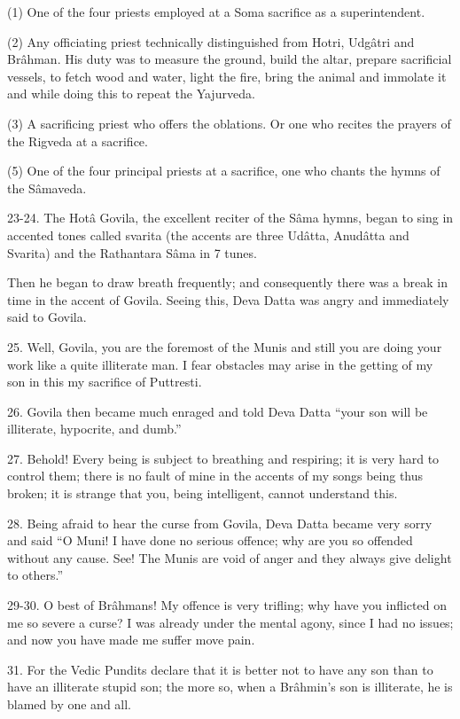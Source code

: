 (1) One of the four priests employed at a Soma sacrifice as a superintendent.

(2) Any officiating priest technically distinguished from Hotri, Udg\^atri and Br\^ahman. His duty was to measure the ground, build the altar, prepare sacrificial vessels, to fetch wood and water, light the fire, bring the animal and immolate it and while doing this to repeat the Yajurveda.

(3) A sacrificing priest who offers the oblations. Or one who recites the prayers of the Rigveda at a sacrifice.

(5) One of the four principal priests at a sacrifice, one who chants the hymns of the S\^amaveda.

23-24. The Hot\^a Govila, the excellent reciter of the S\^ama hymns, began to sing in accented tones called svarita (the accents are three Ud\^atta, Anud\^atta and Svarita) and the Rathantara S\^ama in 7 tunes.

Then he began to draw breath frequently; and consequently there was a break in time in the accent of Govila. Seeing this, Deva Datta was angry and immediately said to Govila.

25. Well, Govila, you are the foremost of the Munis and still you are doing your work like a quite illiterate man. I fear obstacles may arise in the getting of my son in this my sacrifice of Puttresti.

26. Govila then became much enraged and told Deva Datta ``your son will be illiterate, hypocrite, and dumb.''

27. Behold! Every being is subject to breathing and respiring; it is very hard to control them; there is no fault of mine in the accents of my songs being thus broken; it is strange that you, being intelligent, cannot understand this.

28. Being afraid to hear the curse from Govila, Deva Datta became very sorry and said ``O Muni! I have done no serious offence; why are you so offended without any cause. See! The Munis are void of anger and they always give delight to others.''

29-30. O best of Br\^ahmans! My offence is very trifling; why have you inflicted on me so severe a curse? I was already under the mental agony, since I had no issues; and now you have made me suffer move pain.

31. For the Vedic Pundits declare that it is better not to have any son than to have an illiterate stupid son; the more so, when a Br\^ahmin's son is illiterate, he is blamed by one and all.

